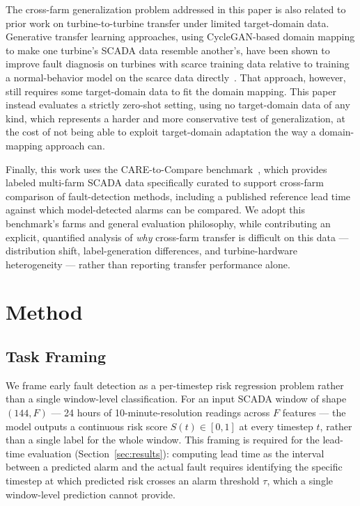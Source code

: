 \documentclass[conference]{IEEEtran}
\begin{document}
The cross-farm generalization problem addressed in this paper is also
related to prior work on turbine-to-turbine transfer under limited
target-domain data. Generative transfer learning approaches, using
CycleGAN-based domain mapping to make one turbine's SCADA data resemble
another's, have been shown to improve fault diagnosis on turbines with
scarce training data relative to training a normal-behavior model on the
scarce data directly~\cite{generativetransfer2025}. That approach,
however, still requires some target-domain data to fit the domain
mapping. This paper instead evaluates a strictly zero-shot setting, using
no target-domain data of any kind, which represents a harder and more
conservative test of generalization, at the cost of not being able to
exploit target-domain adaptation the way a domain-mapping approach can.
 
Finally, this work uses the CARE-to-Compare benchmark~\cite{gueck2024},
which provides labeled multi-farm SCADA data specifically curated to
support cross-farm comparison of fault-detection methods, including a
published reference lead time against which model-detected alarms can be
compared. We adopt this benchmark's farms and general evaluation
philosophy, while contributing an explicit, quantified analysis of
\emph{why} cross-farm transfer is difficult on this data --- distribution
shift, label-generation differences, and turbine-hardware
heterogeneity --- rather than reporting transfer performance alone.

\section{Method}
\label{sec:method}

\subsection{Task Framing}

We frame early fault detection as a per-timestep risk regression problem
rather than a single window-level classification. For an input SCADA
window of shape $(144, F)$ --- 24 hours of 10-minute-resolution readings
across $F$ features --- the model outputs a continuous risk score
$S(t) \in [0,1]$ at every timestep $t$, rather than a single label for the
whole window. This framing is required for the lead-time evaluation
(Section~\ref{sec:results}): computing lead time as the interval between a
predicted alarm and the actual fault requires identifying the specific
timestep at which predicted risk crosses an alarm threshold $\tau$, which a
single window-level prediction cannot provide.
\end{document}
